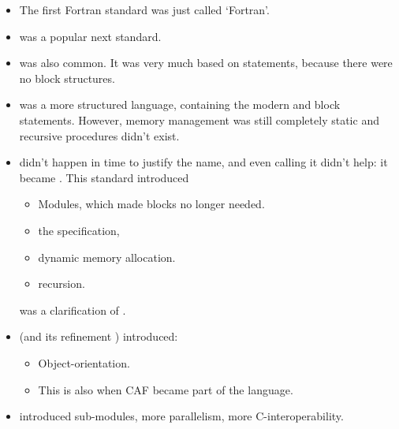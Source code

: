 \begin{itemize}
\item The first Fortran standard was just called `Fortran'.
\item {} was a popular next standard.
\item {} was also common. It was very much based on
   statements, because there were no block structures.
\item {} was a more structured language, containing the
  modern  and  block statements.
  However, memory management was still completely static
  and recursive procedures didn't exist.
\item {} didn't happen in time to justify the name, and
  even calling it  didn't help: it became
  . This standard introduced
  \begin{itemize}
  \item  Modules, which made
     blocks no longer needed.
  \item the  specification,
  \item dynamic memory allocation.
  \item recursion.
  \end{itemize}
   was a clarification of .
\item {} (and its refinement )
  introduced:
  \begin{itemize}
  \item  Object-orientation.
  \item This is also when \ac{CAF} became part of the language.
  \end{itemize}
\item {} introduced sub-modules, more parallelism, more
  C-interoperability.
\end{itemize}
